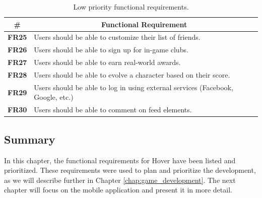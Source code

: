 \begin{table}[H]
    \centering
    \begin{tabularx}{\textwidth}{|>{\small}c|X|}
        \hline
        \textbf{\#} & \multicolumn{1}{c|}{\textbf{Functional Requirement}} \\ \hline
        \textbf{FR25} & Users should be able to customize their list of friends. \\ 
        \textbf{FR26} & Users should be able to sign up for in-game clubs. \\ 
        \textbf{FR27} & Users should be able to earn real-world awards.\\
        \textbf{FR28} & Users should be able to evolve a character based on their score. \\
        \textbf{FR29} & Users should be able to log in using external services (Facebook, Google, etc.) \\ 
        \textbf{FR30} & Users should be able to comment on feed elements.\\ \hline
    \end{tabularx}
    \caption{Low priority functional requirements.}
    \label{tab:FR_low}
    \vspace*{-\baselineskip}
\end{table}

\subsection{Summary}
In this chapter, the functional requirements for Hover have been listed and prioritized. These requirements were used to plan and prioritize the development, as we will describe further in Chapter \ref{chap:game_development}. The next chapter will focus on the mobile application and present it in more detail.